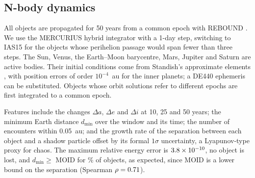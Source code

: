 \documentclass[journal]{IEEEtran}
\begin{document}
\subsection{N-body dynamics}
All objects are propagated for 50 years from a common epoch with REBOUND \cite{rein2012}. We use the MERCURIUS hybrid integrator \cite{rein2019} with a 1-day step, switching to IAS15 \cite{rein2015} for the \NIAS{} objects whose perihelion passage would span fewer than three steps. The Sun, Venus, the Earth--Moon barycentre, Mars, Jupiter and Saturn are active bodies. Their initial conditions come from Standish's approximate elements \cite{standish}, with position errors of order $10^{-4}$~au for the inner planets; a DE440 ephemeris \cite{park2021} can be substituted. Objects whose orbit solutions refer to different epochs are first integrated to a common epoch.

Features include the changes $\Delta a$, $\Delta e$ and $\Delta i$ at 10, 25 and 50 years; the minimum Earth distance $d_{\min}$ over the window and its time; the number of encounters within 0.05~au; and the growth rate of the separation between each object and a shadow particle offset by its formal $1\sigma$ uncertainty, a Lyapunov-type proxy for chaos. The maximum relative energy error is $3.8\times10^{-10}$, no object is lost, and $d_{\min}\ge$ MOID for \FracDminGeMoid\% of objects, as expected, since MOID is a lower bound on the separation (Spearman $\rho=0.71$).
\end{document}
